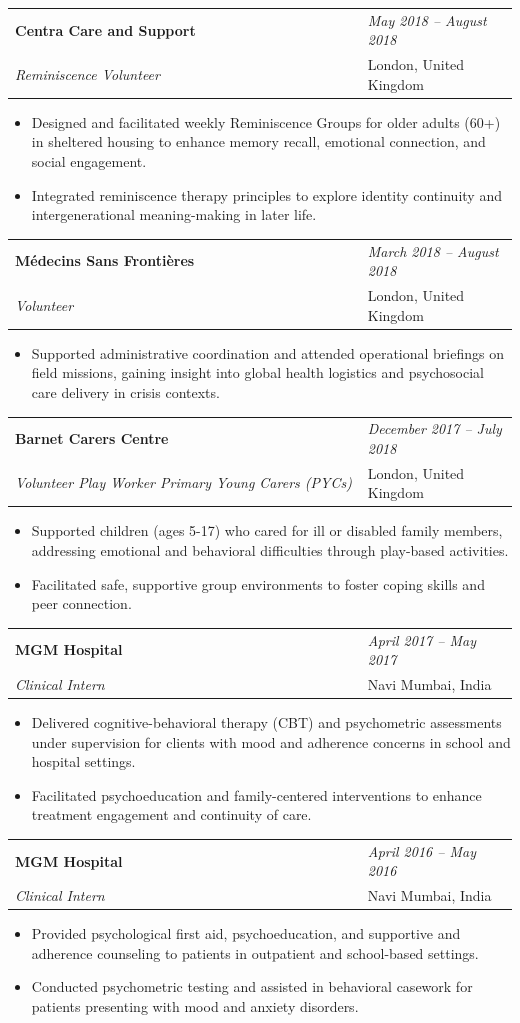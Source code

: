\documentclass[a4paper,11pt]{article}
\newcommand{\resumeSubheading}[4]{
\vspace{0.5mm}\item
    \begin{tabularx}{0.98\textwidth}[t]{p{0.7\linewidth} >{\raggedleft\arraybackslash}p{0.3\linewidth}}
        \textbf{#1} & \textit{\footnotesize{#4}} \\
        \textit{{#3}} &  \footnotesize{#2}\\
    \end{tabularx}
    \vspace{-2.4mm}
}
\newcommand{\resumeItemListStart}{\begin{itemize}[leftmargin=*,labelsep=1mm,itemsep=0.5mm]}
\newcommand{\resumeItemListEnd}{\end{itemize}\vspace{-2mm}}
\begin{document}
\resumeSubheading
{Centra Care and Support}{London, United Kingdom}
{Reminiscence Volunteer}
{May 2018 – August 2018}
\resumeItemListStart
\item Designed and facilitated weekly Reminiscence Groups for older adults (60+) in sheltered housing to enhance memory recall, emotional connection, and social engagement.
\item Integrated reminiscence therapy principles to explore identity continuity and intergenerational meaning-making in later life.
\resumeItemListEnd

\resumeSubheading
{Médecins Sans Frontières}{London, United Kingdom}
{Volunteer}
{March 2018 – August 2018}
\resumeItemListStart
\item Supported administrative coordination and attended operational briefings on field missions, gaining insight into global health logistics and psychosocial care delivery in
crisis contexts.
\resumeItemListEnd

\resumeSubheading
{Barnet Carers Centre}{London, United Kingdom}
{Volunteer Play Worker Primary Young Carers (PYCs)}
{December 2017 – July 2018}
\resumeItemListStart
\item Supported children (ages 5-17) who cared for ill or disabled family members, addressing emotional and behavioral difficulties through play-based activities.
\item Facilitated safe, supportive group environments to foster coping skills and peer connection.
\resumeItemListEnd

\resumeSubheading
{MGM Hospital}{Navi Mumbai, India}
{Clinical Intern}
{April 2017 – May 2017}
\resumeItemListStart
\item Delivered cognitive-behavioral therapy (CBT) and psychometric assessments under supervision for clients with mood and adherence concerns in school and hospital
settings.
\item Facilitated psychoeducation and family-centered interventions to enhance treatment engagement and continuity of care.
\resumeItemListEnd

\resumeSubheading
{MGM Hospital}{Navi Mumbai, India}
{Clinical Intern}
{April 2016 – May 2016}
\resumeItemListStart
\item Provided psychological first aid, psychoeducation, and supportive and adherence counseling to patients in outpatient and school-based settings.
\item Conducted psychometric testing and assisted in behavioral casework for patients presenting with mood and anxiety disorders.
\resumeItemListEnd
\end{document}
